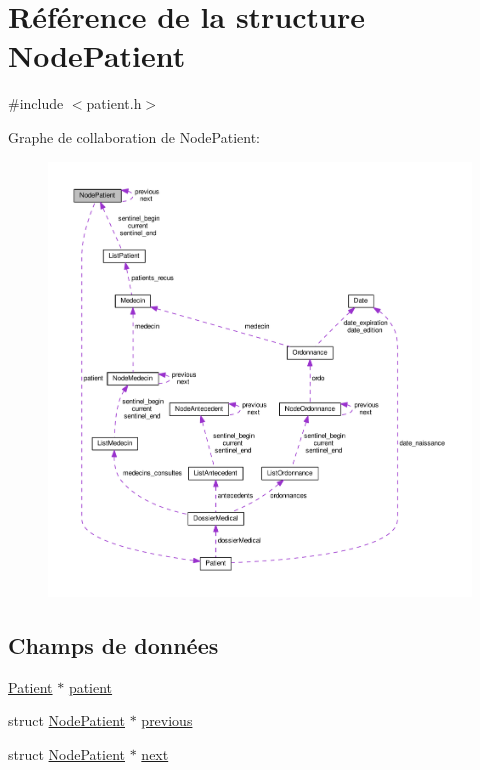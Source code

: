 \hypertarget{struct_node_patient}{\section{Référence de la structure Node\-Patient}
\label{struct_node_patient}
}


{\ttfamily \#include $<$patient.\-h$>$}



Graphe de collaboration de Node\-Patient\-:
\nopagebreak
\begin{figure}[H]
\begin{center}
\leavevmode
\includegraphics[width=350pt]{struct_node_patient__coll__graph}
\end{center}
\end{figure}
\subsection*{Champs de données}
\begin{DoxyCompactItemize}
\item 
\hyperlink{struct_patient}{Patient} $\ast$ \hyperlink{struct_node_patient_a602d93e6dfbb9a54fc31419f2463ac2b}{patient}
\item 
struct \hyperlink{struct_node_patient}{Node\-Patient} $\ast$ \hyperlink{struct_node_patient_ad96b030b2d205d958d0119a33cd84723}{previous}
\item 
struct \hyperlink{struct_node_patient}{Node\-Patient} $\ast$ \hyperlink{struct_node_patient_aed83e2f44d9cd8414c6dceebd6e34f40}{next}
\end{DoxyCompactItemize}


